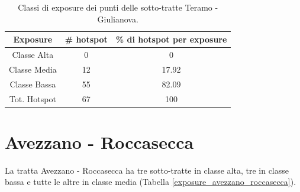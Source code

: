 \begin{table}[H]
	\centering
	\begin{tabular}{|c|c|c|}
		\hline
		\rowcolor[HTML]{C0C0C0} 
		\textbf{Exposure} & \textbf{\# hotspot} & \textbf{\% di hotspot per exposure} \\ \hline
		Classe Alta       & 0                  & 0                                   \\ \hline
		Classe Media      & 12                 & 17.92                           \\ \hline
		Classe Bassa      & 55              & 82.09                               \\ \hline
		Tot. Hotspot      & 67               & 100                                 \\ \hline
	\end{tabular}
	\caption{Classi di exposure dei punti delle sotto-tratte Teramo - Giulianova.}
	\label{risultati_teramo_giulianova}
\end{table}

\section{Avezzano - Roccasecca}

La tratta Avezzano - Roccasecca ha tre sotto-tratte in classe alta, tre in classe bassa e tutte le altre in classe media (Tabella \ref{exposure_avezzano_roccasecca}).

